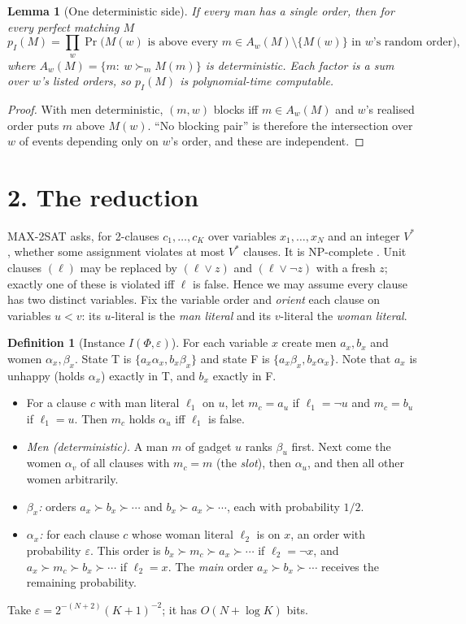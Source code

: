 \documentclass[11pt]{article}
\newtheorem{lemma}[theorem]{Lemma}
\theoremstyle{definition}
\newtheorem{definition}[theorem]{Definition}
\begin{document}
\begin{lemma}[One deterministic side]\label{lem:prod}
If every man has a single order, then for every perfect matching $M$
\[
p_I(M)=\prod_{w}\Pr\bigl(M(w)\text{ is above every }m\in A_w(M)\setminus\{M(w)\}\text{ in }w\text{'s random order}\bigr),
\]
where $A_w(M)=\{m:\ w\succ_m M(m)\}$ is deterministic. Each factor is a sum over $w$'s listed orders, so $p_I(M)$ is
polynomial-time computable.
\end{lemma}
\begin{proof}
With men deterministic, $(m,w)$ blocks iff $m\in A_w(M)$ and $w$'s realised order puts $m$ above $M(w)$.
``No blocking pair'' is therefore the intersection over $w$ of events depending only on $w$'s order, and these are independent.
\end{proof}

\section*{2. The reduction}
MAX-2SAT asks, for 2-clauses $c_1,\dots,c_K$ over variables $x_1,\dots,x_N$ and an integer $V^*$, whether some assignment
violates at most $V^*$ clauses. It is NP-complete \cite{gjs}. Unit clauses $(\ell)$ may be replaced by
$(\ell\vee z)$ and $(\ell\vee\neg z)$ with a fresh $z$; exactly one of these is violated iff $\ell$ is false.
Hence we may assume every clause has two distinct variables. Fix the variable order and \emph{orient} each clause on
variables $u<v$: its $u$-literal is the \emph{man literal} and its $v$-literal the \emph{woman literal}.

\begin{definition}[Instance $I(\Phi,\varepsilon)$]
For each variable $x$ create men $a_x,b_x$ and women $\alpha_x,\beta_x$. State T is $\{a_x\alpha_x,b_x\beta_x\}$ and
state F is $\{a_x\beta_x,b_x\alpha_x\}$. Note that $a_x$ is unhappy (holds $\alpha_x$) exactly in T, and $b_x$ exactly in F.
\begin{itemize}
\item For a clause $c$ with man literal $\ell_1$ on $u$, let $m_c=a_u$ if $\ell_1=\neg u$ and $m_c=b_u$ if $\ell_1=u$.
Then $m_c$ holds $\alpha_u$ iff $\ell_1$ is false.
\item \emph{Men (deterministic).} A man $m$ of gadget $u$ ranks $\beta_u$ first. Next come the women
$\alpha_v$ of all clauses with $m_c=m$ (the \emph{slot}), then $\alpha_u$, and then all other women arbitrarily.
\item \emph{$\beta_x$:} orders $a_x\succ b_x\succ\cdots$ and $b_x\succ a_x\succ\cdots$, each with probability $1/2$.
\item \emph{$\alpha_x$:} for each clause $c$ whose woman literal $\ell_2$ is on $x$, an order with probability
$\varepsilon$. This order is $b_x\succ m_c\succ a_x\succ\cdots$ if $\ell_2=\neg x$, and $a_x\succ m_c\succ b_x\succ\cdots$ if
$\ell_2=x$. The \emph{main} order $a_x\succ b_x\succ\cdots$ receives the remaining probability.
\end{itemize}
Take $\varepsilon=2^{-(N+2)}(K+1)^{-2}$; it has $O(N+\log K)$ bits.
\end{definition}
\end{document}
